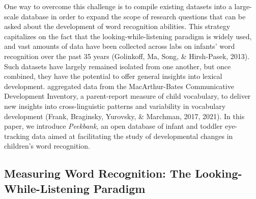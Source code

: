 \documentclass[
  english,
  man,floatsintext]{apa6}
\providecommand{\DIFaddtex}[1]{{\protect\color{blue}{#1}}} %
\providecommand{\DIFdeltex}[1]{}                      %
\providecommand{\DIFaddbegin}{} %
\providecommand{\DIFaddend}{} %
\providecommand{\DIFdelbegin}{} %
\providecommand{\DIFdelend}{} %
\providecommand{\DIFadd}[1]{\texorpdfstring{\DIFaddtex{#1}}{#1}} %
\providecommand{\DIFdel}[1]{\texorpdfstring{\DIFdeltex{#1}}{}} %
\newcommand{\DIFscaledelfig}{0.5}
\newlength{\DIFdelgraphicswidth} %
\newlength{\DIFdelgraphicsheight} %
\newcommand{\DIFaddincludegraphics}[2][]{{\color{blue}\fbox{\DIFOincludegraphics[#1]{#2}}}} %
\newcommand{\DIFdelincludegraphics}[2][]{%
\sbox{\DIFdelgraphicsbox}{\DIFOincludegraphics[#1]{#2}}%
\settoboxwidth{\DIFdelgraphicswidth}{\DIFdelgraphicsbox} %
\settoboxtotalheight{\DIFdelgraphicsheight}{\DIFdelgraphicsbox} %
\scalebox{\DIFscaledelfig}{%
\parbox[b]{\DIFdelgraphicswidth}{\usebox{\DIFdelgraphicsbox}\\[-\baselineskip] \rule{\DIFdelgraphicswidth}{0em}}\llap{\resizebox{\DIFdelgraphicswidth}{\DIFdelgraphicsheight}{%
\setlength{\unitlength}{\DIFdelgraphicswidth}%
\begin{picture}(1,1)%
\thicklines\linethickness{2pt} %
{\color[rgb]{1,0,0}\put(0,0){\framebox(1,1){}}}%
{\color[rgb]{1,0,0}\put(0,0){\line( 1,1){1}}}%
{\color[rgb]{1,0,0}\put(0,1){\line(1,-1){1}}}%
\end{picture}%
}\hspace*{3pt}}} %
} %
\DeclareRobustCommand{\DIFaddbegin}{\DIFOaddbegin \let\includegraphics\DIFaddincludegraphics} %
\DeclareRobustCommand{\DIFaddend}{\DIFOaddend \let\includegraphics\DIFOincludegraphics} %
\DeclareRobustCommand{\DIFdelbegin}{\DIFOdelbegin \let\includegraphics\DIFdelincludegraphics} %
\DeclareRobustCommand{\DIFdelend}{\DIFOaddend \let\includegraphics\DIFOincludegraphics} %
\begin{document}
One way to overcome this challenge is to compile existing datasets into a large-scale database in order to expand the scope of research questions that can be asked about the development of word recognition abilities.
This strategy capitalizes on the fact that the looking-while-listening paradigm is widely used, and vast amounts of data have been collected across labs on infants' word recognition over the past 35 years (Golinkoff, Ma, Song, \& Hirsh-Pasek, 2013).
Such datasets have largely remained isolated from one another, but once combined, they have the potential to offer general insights into lexical development.
\DIFdelbegin \DIFdel{Similar efforts to collect other measures of language development have borne fruit in recent years.For example, WordBank }\DIFdelend \DIFaddbegin \DIFadd{There has been a long history of efforts to aggregate data in a unified format in developmental and cognitive psychology, generating projects that have often had a tremendous impact on the field.
Prominent examples in language research include the English Lexicon Project, which provides an open repository of psycholinguistic data for over 80,000 English words and non-words in order to support large-scale investigations of lexical processing (Balota et al., 2007); the Child Language Data Exchange System (CHILDES), which has played an instrumental role in the study of early language environments by systematizing and aggregating data from naturalistic child-caregiver language interactions (MacWhinney, 2000); and WordBank, which }\DIFaddend aggregated data from the MacArthur-Bates Communicative Development Inventory, a parent-report measure of child vocabulary, to deliver new insights into cross-linguistic patterns and variability in vocabulary development (Frank, Braginsky, Yurovsky, \& Marchman, 2017, 2021).
In this paper, we introduce \emph{Peekbank}, an open database of infant and toddler eye-tracking data aimed at facilitating the study of developmental changes in children's word recognition.

\hypertarget{measuring-word-recognition-the-looking-while-listening-paradigm}{%
\subsection{Measuring Word Recognition: The Looking-While-Listening Paradigm}\label{measuring-word-recognition-the-looking-while-listening-paradigm}}
\end{document}
